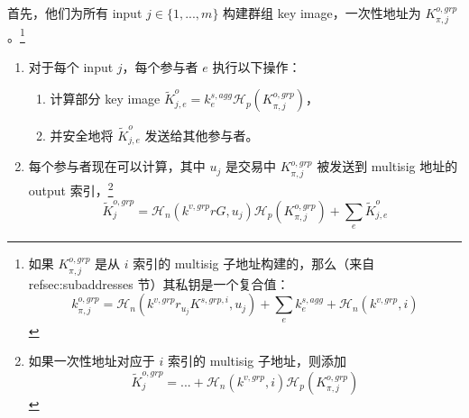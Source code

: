 首先，他们为所有 input $j \in \{1,...,m\}$ 构建群组 key image，一次性地址为 $K^{o,grp}_{\pi,j}$。\footnote{如果 $K^{o,grp}_{\pi,j}$ 是从 $i$ 索引的 multisig 子地址构建的，那么（来自 \\ref{sec:subaddresses} 节）其私钥是一个复合值：
\[k^{o,grp}_{\pi,j} = \mathcal{H}_n(k^{v,grp} r_{u_j} K^{s,grp,i}, u_j) + \sum_e k^{s,agg}_e + \mathcal{H}_n(k^{v,grp},i)\]}
\begin{enumerate}
    \item 对于每个 input $j$，每个参与者 $e$ 执行以下操作：
    \begin{enumerate}
        \item 计算部分 key image $\tilde{K}^{o}_{j,e} = k^{s,agg}_e \mathcal{H}_p(K^{o,grp}_{\pi,j})$，
        \item 并安全地将 $\tilde{K}^{o}_{j,e}$ 发送给其他参与者。
    \end{enumerate}
    \item 每个参与者现在可以计算，其中 $u_j$ 是交易中 $K^{o,grp}_{\pi,j}$ 被发送到 multisig 地址的 output 索引，\footnote{如果一次性地址对应于 $i$ 索引的 multisig 子地址，则添加
    \[\tilde{K}^{o,grp}_j = ... + \mathcal{H}_n(k^{v,grp},i) \mathcal{H}_p(K^{o,grp}_{\pi,j})\]}
    \[\tilde{K}^{o,grp}_j = \mathcal{H}_n(k^{v,grp} r G, u_j) \mathcal{H}_p(K^{o,grp}_{\pi,j}) + \sum_e \tilde{K}^{o}_{j,e}\]
\end{enumerate}

